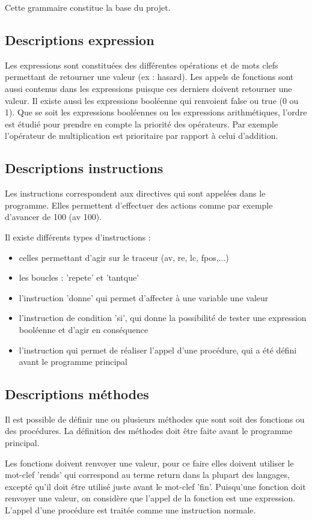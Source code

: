 \documentclass[a4paper,11pt]{article}
\begin{document}
Cette grammaire constitue la base du projet.

\subsection{Descriptions expression}
Les expressions sont constituées des différentes opérations et de mots clefs permettant de retourner une valeur (ex : hasard). Les appels de fonctions sont aussi contenus dans les expressions puisque ces derniers doivent retourner une valeur.
Il existe aussi les expressions booléenne qui renvoient false ou true (0 ou 1).
Que se soit les expressions booléennes ou les expressions arithmétiques, l'ordre est étudié pour prendre en compte la priorité des opérateurs. Par exemple l'opérateur de multiplication est prioritaire par rapport à celui d'addition.

\subsection{Descriptions instructions}
Les instructions correspondent aux directives qui sont appelées dans le programme. Elles permettent d'effectuer des actions comme par exemple d'avancer de 100 (av 100).

Il existe différents types d'instructions :
\begin{itemize}
	\item celles permettant d'agir sur le traceur (av, re, lc, fpos,...)
	\item les boucles : 'repete' et 'tantque'
	\item l'instruction 'donne' qui permet d'affecter à une variable une valeur
	\item l'instruction de condition 'si', qui donne la possibilité de tester une expression booléenne et d'agir en conséquence
	\item l'instruction qui permet de réaliser l'appel d'une procédure, qui a été défini avant le programme principal
\end{itemize}

\subsection{Descriptions méthodes}
Il est possible de définir une ou plusieurs méthodes que sont soit des fonctions ou des procédures. La définition des méthodes doit être faite avant le programme principal.

Les fonctions doivent renvoyer une valeur, pour ce faire elles doivent utiliser le mot-clef 'rends' qui correspond au terme return dans la plupart des langages, excepté qu'il doit être utilisé juste avant le mot-clef 'fin'.
Puisqu'une fonction doit renvoyer une valeur, on considère que l'appel de la fonction est une expression.
L'appel d'une procédure est traitée comme une instruction normale.
\end{document}

